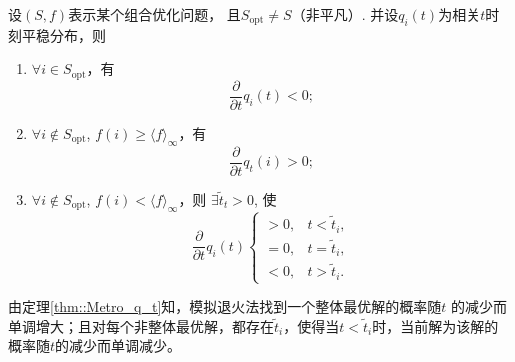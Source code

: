 \begin{theorem}{} 设$(S, f)$表示某个组合优化问题，
  且$S_{\mathrm{opt}} \neq S$（非平凡）. 并设$q_i(t)$为相关$t$时刻平稳分布，则
  \begin{enumerate}
  \item $\forall i \in S_{\mathrm{opt}}$，有
    \begin{equation}
      \frac{\partial}{\partial t}q_i(t) < 0;
    \end{equation}
  \item $\forall i \notin S_{\mathrm{opt}}$, $f(i) \geq \langle f\rangle_\infty$，有
    \begin{equation}
      \frac{\partial}{\partial t} q_t(i) > 0;
    \end{equation}
  \item $\forall i \notin S_{\mathrm{opt}}$, $f(i) < \langle f\rangle_\infty$，则
    $\exists \tilde{t}_t > 0$, 使
    \begin{equation}
      \frac{\partial}{\partial t} q_i(t) \left\{
      \begin{array}{ll}
        > 0, & t < \tilde{t}_i, \\
        = 0, & t = \tilde{t}_i, \\
        < 0, & t > \tilde{t}_i.
      \end{array}
      \right.
    \end{equation}
  \end{enumerate}
  \label{thm::Metro_q_t}
\end{theorem}

由定理\ref{thm::Metro_q_t}知，模拟退火法找到一个整体最优解的概率随$t$
的减少而单调增大；且对每个非整体最优解，都存在$\tilde{t}_i$，使得当$t
< \tilde{t}_i$时，当前解为该解的概率随$t$的减少而单调减少。


